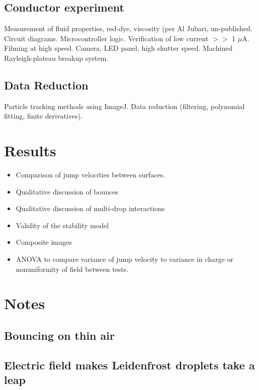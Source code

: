 \documentclass{jfm}
\begin{document}
\subsection{Conductor experiment}
Measurement of fluid properties, red-dye, viscosity (per Al Jubari, un-published. Circuit diagrams. Microcontroller logic. Verification of low current $>>$ 1 $\mu$A. Filming at high speed. Camera, LED panel, high shutter speed. Machined Rayleigh-plateau breakup system.
\subsection{Data Reduction}
Particle tracking methods using ImageJ. Data reduction (filtering, polynomial fitting, finite derivatives).



\section{Results}
\begin{itemize}
\item Comparison of jump velocities between surfaces.
\item Qualitative discussion of bounces
\item Qualitative discussion of multi-drop interactions
\item Validity of the stability model
\item Composite images
\item ANOVA to compare variance of jump velocity to variance in charge or nonuniformity of field between tests.
\end{itemize}

\section{Notes}
\subsection{Bouncing on thin air}
\subsection{Electric field makes Leidenfrost droplets take a leap}
\end{document}
